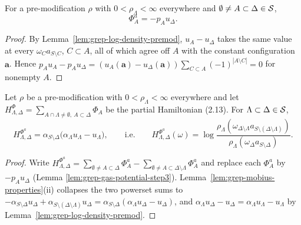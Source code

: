 \begin{lemma}
    \label{lem:grep-gas-potential-step3}
    \leanok

    For a pre-modification $\rho$ with $0 < \rho_\Lambda < \infty$ everywhere and
    $\emptyset \neq A \subset \Delta \in \mathcal{S}$,
    \[
        \Phi^a_A = -p_A u_\Delta .
    \]
\end{lemma}
\begin{proof}
    \leanok

    By Lemma~\ref{lem:grep-log-density-premod}, $u_A - u_\Delta$ takes the same value at every
    $\omega_C a_{S \setminus C}$, $C \subset A$, all of which agree off $A$ with the constant
    configuration $\mathbf{a}$.  Hence
    $p_A u_A - p_A u_\Delta = (u_A(\mathbf a) - u_\Delta(\mathbf a)) \sum_{C \subset A}(-1)^{|A\setminus C|} = 0$
    for nonempty $A$.
\end{proof}

\begin{lemma}
    \label{lem:grep-partial-hamiltonian}
    \leanok

    Let $\rho$ be a pre-modification with $0 < \rho_\Lambda < \infty$ everywhere and let
    $H^\Phi_{\Lambda,\Delta} = \sum_{A \cap \Lambda \neq \emptyset,\ A \subset \Delta} \Phi_A$
    be the partial Hamiltonian (2.13).  For $\Lambda \subset \Delta \in \mathcal{S}$,
    \[
        H^{\Phi^a}_{\Lambda,\Delta} = \alpha_{S\setminus\Delta}\bigl(\alpha_\Lambda u_\Lambda - u_\Lambda\bigr),
        \qquad\text{i.e.}\qquad
        H^{\Phi^a}_{\Lambda,\Delta}(\omega) = \log \frac{\rho_\Lambda(\omega_{\Delta \setminus \Lambda} a_{S \setminus (\Delta \setminus \Lambda)})}{\rho_\Lambda(\omega_\Delta a_{S \setminus \Delta})} .
    \]
\end{lemma}
\begin{proof}
    \leanok

    Write $H^{\Phi^a}_{\Lambda,\Delta} = \sum_{\emptyset \neq A \subset \Delta}\Phi^a_A - \sum_{\emptyset \neq A \subset \Delta\setminus\Lambda}\Phi^a_A$
    and replace each $\Phi^a_A$ by $-p_A u_\Delta$ (Lemma \ref{lem:grep-gas-potential-step3}).
    Lemma~\ref{lem:grep-mobius-properties}(ii) collapses the two powerset sums to
    $-\alpha_{S\setminus\Delta}u_\Delta + \alpha_{S\setminus(\Delta\setminus\Lambda)}u_\Delta
    = \alpha_{S\setminus\Delta}(\alpha_\Lambda u_\Delta - u_\Delta)$, and
    $\alpha_\Lambda u_\Delta - u_\Delta = \alpha_\Lambda u_\Lambda - u_\Lambda$ by
    Lemma~\ref{lem:grep-log-density-premod}.
\end{proof}

